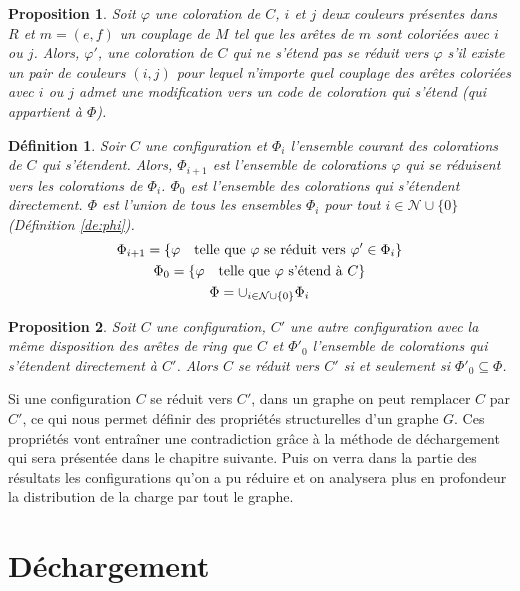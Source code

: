 \documentclass[10pt,a4paper]{article}
\newtheorem{definition}{Définition}
\newtheorem{proposition}{Proposition}
\begin{document}
\begin{proposition}
Soit $\varphi$ une coloration de $C$, $i$ et $j$ deux couleurs présentes dans $R$ et $m = (e,f)$ un couplage de $M$ tel que les arêtes de $m$ sont coloriées avec $i$ ou $j$. Alors, $\varphi'$, une coloration de $C$ qui ne s'étend pas \emph{se réduit} vers  $\varphi$ s'il existe un pair de couleurs $(i,j)$ pour lequel n'importe quel couplage des arêtes coloriées avec $i$ ou $j$ admet une modification vers un code de coloration qui s'étend (qui appartient à $\Phi$).
\label{pro:phii}
\end{proposition}

\begin{definition}
Soir $C$ une configuration et $\Phi_i$ l'ensemble courant des colorations de $C$ qui s'étendent. Alors, $\Phi_{i+1}$ est l'ensemble de colorations $\varphi$ qui se réduisent vers les colorations de $\Phi_i$. $\Phi_0$ est l'ensemble des colorations qui s'étendent directement. $\Phi$ est l'union de tous les ensembles $\Phi_i$ pour tout $i \in \mathcal{N} \cup \lbrace 0\rbrace$ (Définition \ref{de:phi}). 
$$
\gathered
\Phi_{i+1} = \lbrace \varphi \quad \textrm{telle que $\varphi$ se réduit vers $\varphi' \in \Phi_i$} \rbrace\\
\Phi_0 = \lbrace \varphi \quad \textrm{telle que $\varphi$ s'étend à $C$} \rbrace\\
\Phi = \cup_{i \in \mathcal{N}\cup \lbrace 0 \rbrace} \Phi_i 
\endgathered
$$
\end{definition}

\begin{proposition}
Soit $C$ une configuration, $C'$ une autre configuration avec la même disposition des arêtes de ring que $C$ et $\Phi'_0$ l'ensemble de colorations qui s'étendent directement à $C'$. Alors $C$ se réduit vers $C'$ si et seulement si $\Phi'_0 \subseteq \Phi$.
\end{proposition}
\bigskip

Si une configuration $C$ se réduit vers $C'$, dans un graphe on peut remplacer $C$ par $C'$, ce qui nous permet définir des propriétés structurelles d'un graphe $G$. Ces propriétés vont entraîner une contradiction grâce à la méthode de déchargement qui sera présentée dans le chapitre suivante. Puis on verra dans la partie des résultats les configurations qu'on a pu réduire et on analysera plus en profondeur la distribution de la charge par tout le graphe.


\section{Déchargement}
\end{document}
